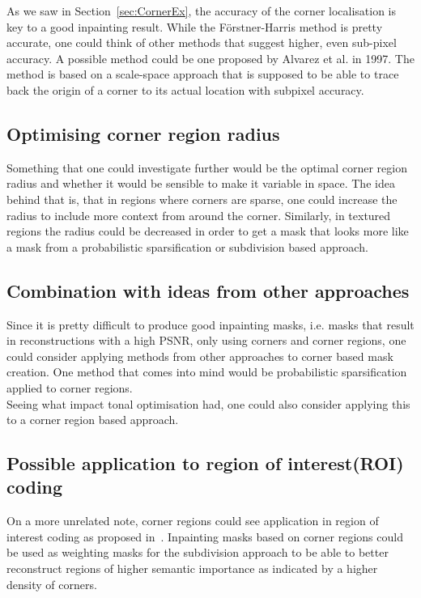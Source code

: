 As we saw in Section~\ref{sec:CornerEx}, the accuracy of the corner localisation is key to a good
inpainting result. While the Förstner-Harris method is pretty accurate, one could think of other
methods that suggest higher, even sub-pixel accuracy. A possible method could be one proposed by
Alvarez et al.\cite{amss} in 1997. The method is based on a scale-space approach that is supposed
to be able to trace back the origin of a corner to its actual location with subpixel accuracy.

\subsection*{Optimising corner region radius}

Something that one could investigate further would be the optimal corner region radius and whether
it would be sensible to make it variable in space. The idea behind that is, that in regions where
corners are sparse, one could increase the radius to include more context from around the corner.
Similarly, in textured regions the radius could be decreased in order to get a mask that looks more
like a mask from a probabilistic sparsification or subdivision based approach.

\subsection*{Combination with ideas from other approaches}

Since it is pretty difficult to produce good inpainting masks, i.e. masks that result in
reconstructions with a high PSNR, only using corners and corner regions, one could consider
applying methods from other approaches to corner based mask creation. One method that comes into
mind would be probabilistic sparsification\cite{hoeltgen12, schmaltz14} applied to corner regions.\\
Seeing what impact tonal optimisation had\cite{hoeltgen12, schmaltz14}, one could also consider
applying this to a corner region based approach.

\subsection*{Possible application to region of interest(ROI) coding}

On a more unrelated note, corner regions could see application in region of interest coding as
proposed in~\cite{peter15}. Inpainting masks based on corner regions could be used as weighting
masks for the subdivision approach to be able to better reconstruct regions of higher semantic
importance as indicated by a higher density of corners.

